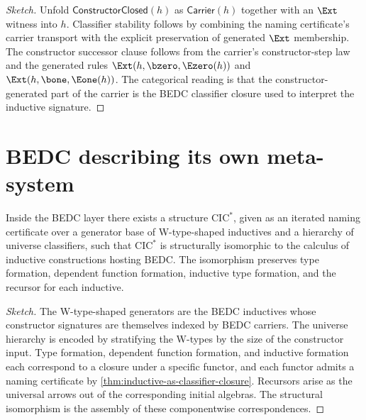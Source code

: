 \begin{proof}[Sketch]
Unfold $\mathsf{ConstructorClosed}(h)$ as $\mathsf{Carrier}(h)$ together with an $\Ext$ witness into $h$. Classifier stability follows by combining the naming certificate's carrier transport with the explicit preservation of generated $\Ext$ membership. The constructor successor clause follows from the carrier's constructor-step law and the generated rules $\Ext(h,\bzero,\Ezero(h))$ and $\Ext(h,\bone,\Eone(h))$. The categorical reading is that the constructor-generated part of the carrier is the BEDC classifier closure used to interpret the inductive signature.
\end{proof}

\section{BEDC describing its own meta-system}
\label{sec:reflection-self-description}

\begin{theorem}
\label{thm:internal-cic-interpretation}
Inside the BEDC layer there exists a structure $\mathrm{CIC}^{*}$, given as an iterated naming certificate over a generator base of W-type-shaped inductives and a hierarchy of universe classifiers, such that $\mathrm{CIC}^{*}$ is structurally isomorphic to the calculus of inductive constructions hosting BEDC. The isomorphism preserves type formation, dependent function formation, inductive type formation, and the recursor for each inductive.
\end{theorem}

\begin{proof}[Sketch]
The W-type-shaped generators are the BEDC inductives whose constructor signatures are themselves indexed by BEDC carriers. The universe hierarchy is encoded by stratifying the W-types by the size of the constructor input. Type formation, dependent function formation, and inductive formation each correspond to a closure under a specific functor, and each functor admits a naming certificate by \autoref{thm:inductive-as-classifier-closure}. Recursors arise as the universal arrows out of the corresponding initial algebras. The structural isomorphism is the assembly of these componentwise correspondences.
\end{proof}

